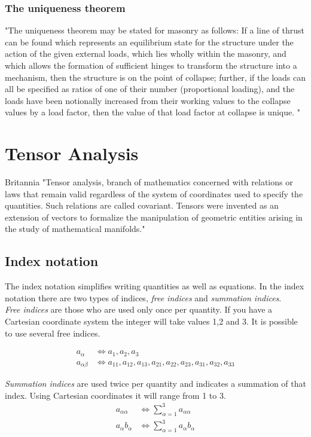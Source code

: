 \subsubsection{The uniqueness theorem}
"The uniqueness theorem may be stated for masonry as follows: If a line of thrust can be found which represents an equilibrium state for the structure under the action of the given external loads, which lies wholly within the masonry, and which allows the formation of sufficient hinges to transform the structure into a mechanism, then the structure is on the point of collapse; further, if the loads can all be specified as ratios of one of their number (proportional loading), and the loads have been notionally increased from their working values to the collapse values by a load factor, then the value of that load factor at collapse is unique. "


\section{Tensor Analysis}

Britannia
"Tensor analysis, branch of mathematics concerned with relations or laws that remain valid regardless of the system of coordinates used to specify the quantities. Such relations are called covariant. Tensors were invented as an extension of vectors to formalize the manipulation of geometric entities arising in the study of mathematical manifolds."

\subsection{Index notation}
The index notation simplifies writing quantities as well as equations. In the index notation there are two types of indices, \textit{free indices} and \textit{summation indices}.\\

\textit{Free indices} are those who are used only once per quantity. If you have a Cartesian coordinate system the integer will take values 1,2 and 3. It is possible to use several free indices.

\begin{align*} 
    a_\alpha  &\Leftrightarrow a_1 , a_2, a_3 \\ 
   a_{\alpha \beta}  &\Leftrightarrow a_{11},a_{12},a_{13},a_{21},a_{22},a_{23},a_{31},a_{32},a_{33}
\end{align*}

\textit{Summation indices} are used twice per quantity and indicates a  summation of that index. Using Cartesian coordinates it will range from 1 to 3.
\begin{align*} 
    a_{\alpha \alpha}  &\Leftrightarrow \sum\limits_{\alpha=1}^3  a_{\alpha \alpha} \\ 
   a_{\alpha}b_\alpha  &\Leftrightarrow \sum\limits_{\alpha=1}^3  a_{\alpha}b_\alpha 
\end{align*}

